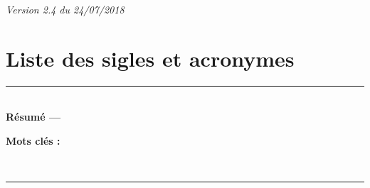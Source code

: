 \documentclass[a4paper,12pt]{book}
\makeatletter
\def\cleardoublepage{\clearpage\if@twoside \ifodd\c@page\else%
  \hbox{}%
  \thispagestyle{empty}%
  \newpage%
  \if@twocolumn\hbox{}\newpage\fi\fi\fi}
\theoremstyle{break}
\makeatother
\begin{document}
\begin{titlepage}
\begin{center}
\vfill

\footnotesize\textit{Version 2.4 du 24/07/2018}

\end{center}
\end{titlepage}


\frontmatter


\clearpage
\tableofcontents

\clearpage
\listoffigures

\clearpage
\chapter*{Liste des sigles et acronymes}
\begin{acronym}[CP-OFDMX] %
\end{acronym}


\mainmatter
\pagestyle{fancy}

\cleardoublepage



\appendix




\clearpage


\thispagestyle{empty}

\vspace*{\fill}
\noindent\rule[2pt]{\textwidth}{0.5pt}\\
{\textbf{Résumé ---}}


{\textbf{Mots clés :}}

\\
\noindent\rule[2pt]{\textwidth}{0.5pt}

\vspace*{\fill}
\end{document}
